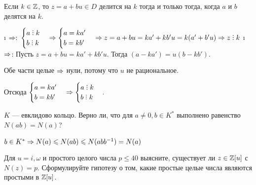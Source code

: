 \begin{problem}[11 (2.5)]
Если $k \in \mathbb{Z}$, то $z= a+bu \in D$ делится на $k$ тогда и только тогда, когда $a$ и $b$ делятся на $k$.
\end{problem}

\begin{solution}

\begin{itemize}
\i
  \(\Rightarrow:\)
  \(\begin{cases} a \Divby k \\ b \Divby k \end{cases} \Then \begin{cases} a = ka' \\ b = kb' \end{cases} \Then z = a+bu = ka'+kb'u=k(a'+b'u) \Then z \Divby k\)
\i
  \(\Rightarrow\):
  Пусть \(z = a + bu = ka' + kb'u\). Тогда \((a - ka') = u(b - kb')\).

  Обе части целые \(\Rightarrow\) нули, потому что \(u\) не рациональное.

  Отсюда \(\begin{cases} a = ka' \\ b = kb' \end{cases} \Then \begin{cases} a \Divby k \\ b \Divby k \end{cases}\).
\end{itemize}

\end{solution}

\begin{problem}[12(2.9 $\When$)]
$K$ — евклидово кольцо. Верно ли, что для $a \ne 0, b \in K^*$ выполнено равенство $N(ab) = N(a)$?
\end{problem}

\begin{solution}
\(b \in K^* \Rightarrow N(a) \leqslant N(ab) \leqslant N(abb^{-1}) = N(a)\)
\end{solution}

\begin{problem}[13 (3.2)]
Для $u=i,\omega$ и простого целого числа $p \leq 40$ выясните, существует ли $z \in \mathbb{Z}[u]$ с $N(z)=p$. Сформулируйте гипотезу о том, какие простые целые числа являются простыми в $\mathbb{Z}[u]$. 
\end{problem}

